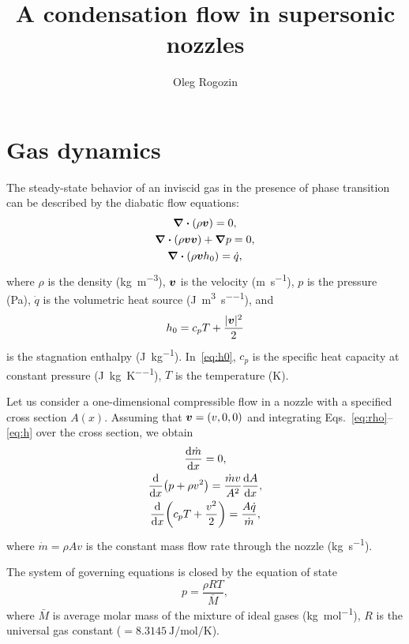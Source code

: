 \documentclass{article}
\title{A condensation flow in supersonic nozzles}
\author{Oleg Rogozin}
\newcommand{\bv}{\vb*{v}}
\begin{document}
\maketitle

\section{Gas dynamics}

The steady-state behavior of an inviscid gas in the presence of phase transition
can be described by the diabatic flow equations:
\begin{gather}
    \div(\rho\bv) = 0, \label{eq:rho}\\
    \div(\rho\bv\bv) + \grad{p} = 0, \label{eq:v}\\
    \div(\rho\bv h_0) = \dot{q}, \label{eq:h}
\end{gather}
where $\rho$ is the density (\si{\kg\per\cubic\m}), $\bv$ is the velocity (\si{\m\per\s}),
$p$ is the pressure (\si{\Pa}), $\dot{q}$ is the volumetric heat source (\si{\J\per\cubic\m\per\s}), and
\begin{equation}\label{eq:h0}
    h_0 = c_pT + \frac{|\bv|^2}{2}
\end{equation}
is the stagnation enthalpy (\si{\J\per\kg}). In~\eqref{eq:h0},
$c_p$ is the specific heat capacity at constant pressure (\si{\J\per\kg\per\K}), $T$ is the temperature (\si{\K}).

Let us consider a one-dimensional compressible flow in a nozzle with a specified cross section $A(x)$.
Assuming that $\bv = (v,0,0)$ and integrating Eqs.~\eqref{eq:rho}--\eqref{eq:h} over the cross section, we obtain
\begin{gather}
    \dv{\dot{m}}{x} = 0, \label{eq:continuity}\\
    \dv{x}(p + \rho v^2) = \frac{\dot{m}v}{A^2}\dv{A}{x}, \label{eq:momentum}\\
    \dv{x}(c_pT + \frac{v^2}{2}) = \frac{A\dot{q}}{\dot{m}}, \label{eq:energy}
\end{gather}
where $\dot{m} = \rho Av$ is the constant mass flow rate through the nozzle (\si{\kg\per\s}).

The system of governing equations is closed by the equation of state
\begin{equation}\label{eq:eos}
    p = \frac{\rho RT}{\bar{M}},
\end{equation}
where $\bar{M}$ is average molar mass of the mixture of ideal gases (\si{\kg\per\mol}),
$R$ is the universal gas constant ($= \SI{8.3145}{\J\per\mol\per\K}$).
\end{document}
